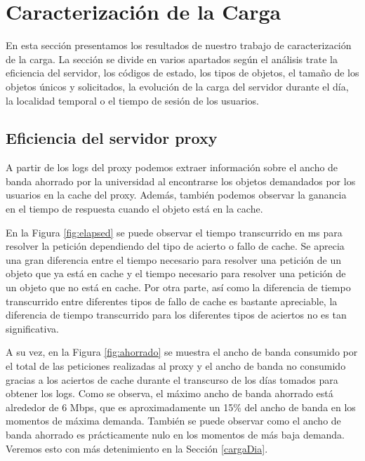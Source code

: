 \documentclass[twocolumn]{Jornadas}
\begin{document}
\section{Caracterización de la Carga}
\label{resultados}

En esta sección presentamos los resultados de nuestro trabajo de caracterización de la carga. La sección se divide en varios apartados según el análisis trate la eficiencia del servidor, los códigos de estado, los tipos de objetos, el tamaño de los objetos únicos y solicitados, la evolución de la carga del servidor durante el día, la localidad temporal o el tiempo de sesión de los usuarios.

\subsection{Eficiencia del servidor proxy}
A partir de los logs del proxy podemos extraer información sobre el ancho de banda ahorrado por la universidad al encontrarse los objetos demandados por los usuarios en la cache del proxy. Además, también podemos observar la ganancia en el tiempo de respuesta cuando el objeto está en la cache.

En la Figura \ref{fig:elapsed} se puede observar el tiempo transcurrido en ms para resolver la petición dependiendo del tipo de acierto o fallo de cache. Se aprecia una gran diferencia entre el tiempo necesario para resolver una petición de un objeto que ya está en cache y el tiempo necesario para resolver una petición de un objeto que no está en cache. Por otra parte, así como la diferencia de tiempo transcurrido entre diferentes tipos de fallo de cache es bastante apreciable, la diferencia de tiempo transcurrido para los diferentes tipos de aciertos no es tan significativa.

A su vez, en la Figura \ref{fig:ahorrado} se muestra el ancho de banda consumido por el total de las peticiones realizadas al proxy y el ancho de banda no consumido gracias a los aciertos de cache durante el transcurso de los días tomados para obtener los logs. Como se observa, el máximo ancho de banda ahorrado está alrededor de 6 Mbps, que es aproximadamente un 15\% del ancho de banda en los momentos de máxima demanda. También se puede observar como el ancho de banda ahorrado es prácticamente nulo en los momentos de más baja demanda. Veremos esto con más detenimiento en la Sección \ref{cargaDia}.
\end{document}
